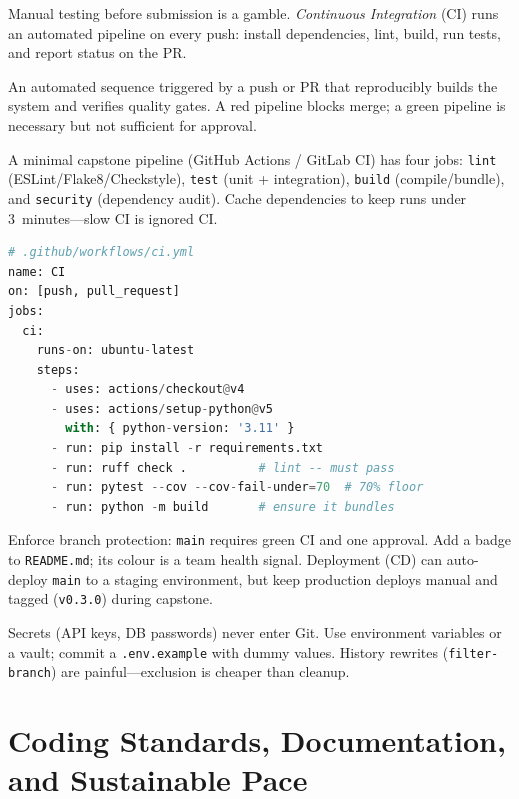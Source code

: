 Manual testing before submission is a gamble. \emph{Continuous Integration} (CI) runs an automated pipeline on every push: install dependencies, lint, build, run tests, and report status on the PR.

\begin{definition}[CI Pipeline]
An automated sequence triggered by a push or PR that reproducibly builds the system and verifies quality gates. A red pipeline blocks merge; a green pipeline is necessary but not sufficient for approval.
\end{definition}

A minimal capstone pipeline (GitHub Actions / GitLab CI) has four jobs: \texttt{lint} (ESLint/Flake8/Checkstyle), \texttt{test} (unit + integration), \texttt{build} (compile/bundle), and \texttt{security} (dependency audit). Cache dependencies to keep runs under 3~minutes---slow CI is ignored CI.

\begin{lstlisting}[language=Python,caption={Minimal CI config sketch (GitHub Actions): lint, test, and block on failure.},label={lst:ci-config}]
# .github/workflows/ci.yml
name: CI
on: [push, pull_request]
jobs:
  ci:
    runs-on: ubuntu-latest
    steps:
      - uses: actions/checkout@v4
      - uses: actions/setup-python@v5
        with: { python-version: '3.11' }
      - run: pip install -r requirements.txt
      - run: ruff check .          # lint -- must pass
      - run: pytest --cov --cov-fail-under=70  # 70% floor
      - run: python -m build       # ensure it bundles
\end{lstlisting}

Enforce branch protection: \texttt{main} requires green CI and one approval. Add a badge to \texttt{README.md}; its colour is a team health signal. Deployment (CD) can auto-deploy \texttt{main} to a staging environment, but keep production deploys manual and tagged (\texttt{v0.3.0}) during capstone.

{\sloppy Secrets (API keys, DB passwords) never enter Git. Use environment variables or a vault; commit a \texttt{.env.example} with dummy values. History rewrites (\texttt{filter-branch}) are painful---exclusion is cheaper than cleanup.\par}

\section{Coding Standards, Documentation, and Sustainable Pace}
\label{sec:standards}

